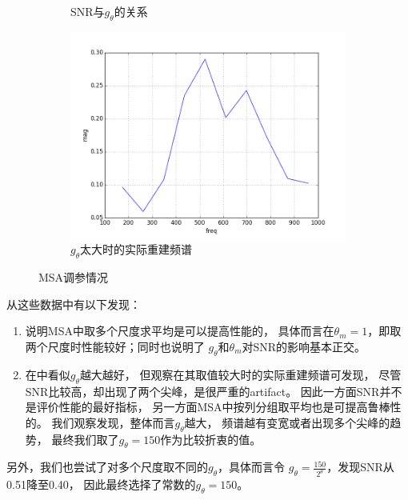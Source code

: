 \begin{figure}[h!]
\begin{center}
\begin{subfigure}[b]{.33\figwidth}
        \caption{SNR与$g_\theta$的关系}
        \label{fig:msa:vg}
    \end{subfigure}
    \begin{subfigure}[b]{.33\figwidth}
        \includegraphics[width=.33\figwidth]{res/msa-800.png}
        \caption{$g_\theta$太大时的实际重建频谱}
        \label{fig:msa:800}
    \end{subfigure}
    \caption{MSA调参情况}
    \label{fig:msa}
\end{center}\end{figure}

从这些数据中有以下发现：
\begin{enumerate}
    \item {}说明MSA中取多个尺度求平均是可以提高性能的，
        具体而言在$\theta_m=1$，即取两个尺度时性能较好；同时也说明了
        $g_\theta$和$\theta_m$对SNR的影响基本正交。
    \item 在中看似$g_\theta$越大越好，
        但观察在其取值较大时的实际重建频谱可发现，
        尽管SNR比较高，却出现了两个尖峰，是很严重的artifact。
        因此一方面SNR并不是评价性能的最好指标，
        另一方面MSA中按列分组取平均也是可提高鲁棒性的。
        我们观察发现，整体而言$g_\theta$越大，
        频谱越有变宽或者出现多个尖峰的趋势，
        最终我们取了$g_\theta=150$作为比较折衷的值。
\end{enumerate}

另外，我们也尝试了对多个尺度取不同的$g_\theta$，具体而言令
$g_\theta=\frac{150}{2^\theta}$，发现SNR从0.51降至0.40，
因此最终选择了常数的$g_\theta=150$。

